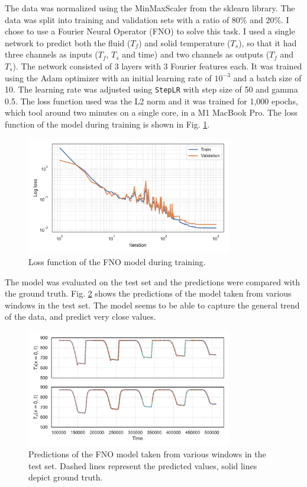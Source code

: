 \documentclass[unicode,11pt,a4paper,oneside,numbers=endperiod,openany]{scrartcl}
\begin{document}
The data was normalized using the MinMaxScaler from the sklearn library.
The data was split into training and validation sets with a
ratio of 80\% and 20\%.
I chose to use a Fourier Neural Operator (FNO) to solve this task. I used a
single network to predict both the fluid ($T_f$) and solid temperature ($T_s$),
so that it had three
channels as inputs ($T_f$, $T_s$ and time) and two channels as outputs ($T_f$ and
$T_s$). 
The network
consisted of 3 layers with 3 Fourier features each.
It was trained using the Adam optimizer with an initial learning rate
of $10^{-3}$ and a batch size of 10. 
The learning rate was adjusted using \texttt{StepLR} with step size of 50 and gamma 0.5.
The loss function used was the L2 norm and it was trained for 1,000 epochs,
which tool around two minutes on a single core, in a M1 MacBook Pro.
The loss function of the model during training is shown in Fig. \ref{fig:loss}.
\begin{figure}[ht!]
    \centering
    \includegraphics[width=0.8\textwidth]{../task1/fno/loss_function.pdf}
    \caption{Loss function of the FNO model during training.}
    \label{fig:loss}
\end{figure}

The model was evaluated on the test set and the predictions were compared with
the ground truth. Fig. \ref{fig:predictions} shows the predictions of the model
taken from various windows in the test set.
The model seems to be able to capture the general trend of the data, and predict
very close values.
\begin{figure}[ht!]
    \centering
    \includegraphics[width=0.8\textwidth]{../task1/fno/plot_predictions.pdf}
    \caption{Predictions of the FNO model taken from various windows in the test set. Dashed lines represent the predicted values, solid lines depict ground truth.}
    \label{fig:predictions}
\end{figure}
\end{document}
